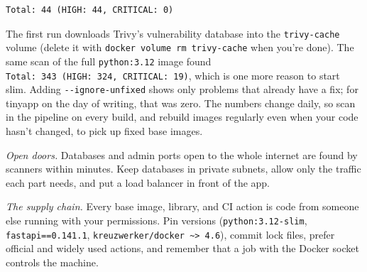 \begin{codeblock}

\begin{Shaded}
\begin{Highlighting}[]
 \DataTypeTok{\textbackslash{}}
   \DataTypeTok{\textbackslash{}}
  \KeywordTok{|} 
\end{Highlighting}
\end{Shaded}

\end{codeblock}

\begin{codeblock}
\begin{Verbatim}[formatcom=\outputstyle]
Total: 44 (HIGH: 44, CRITICAL: 0)
\end{Verbatim}
\end{codeblock}

The first run downloads Trivy's vulnerability database into the \texttt{trivy-cache} volume (delete it with \texttt{docker\ volume\ rm\ trivy-}\allowbreak{}\texttt{cache} when you're done). The same scan of the full \texttt{python:3.12} image found \texttt{Total:}\allowbreak{}\texttt{\ 343\ (HIGH:}\allowbreak{}\texttt{\ 324,}\allowbreak{}\texttt{\ CRITICAL:}\allowbreak{}\texttt{\ 19)}, which is one more reason to start slim. Adding \texttt{-\/-ignore-unfixed} shows only problems that already have a fix; for tinyapp on the day of writing, that was zero. The numbers change daily, so scan in the pipeline on every build, and rebuild images regularly even when your code hasn't changed, to pick up fixed base images.

\emph{Open doors.} Databases and admin ports open to the whole internet are found by scanners within minutes. Keep databases in private subnets, allow only the traffic each part needs, and put a load balancer in front of the app.

\emph{The supply chain.} Every base image, library, and CI action is code from someone else running with your permissions. Pin versions (\texttt{python:3.12-slim}, \texttt{fastapi==0.141.1}, \texttt{kreuzwerker/}\allowbreak{}\texttt{docker\ \textasciitilde{}\textgreater{}\ 4.}\allowbreak{}\texttt{6}), commit lock files, prefer official and widely used actions, and remember that a job with the Docker socket controls the machine.

